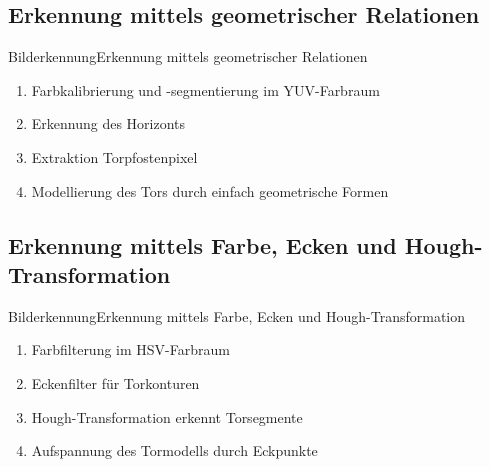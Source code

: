 \documentclass{beamer}
\begin{document}
\subsection{Erkennung mittels geometrischer Relationen}
\begin{frame}{Bilderkennung}{Erkennung mittels geometrischer Relationen}
\begin{enumerate}
    \item Farbkalibrierung und -segmentierung im YUV-Farbraum
    \item Erkennung des Horizonts
    \item Extraktion Torpfostenpixel
    \item Modellierung des Tors durch einfach geometrische Formen
\end{enumerate}
\end{frame}

\subsection{Erkennung mittels Farbe, Ecken und Hough-Transformation}
\begin{frame}{Bilderkennung}{Erkennung mittels Farbe, Ecken und Hough-Transformation}
\begin{enumerate}
    \item Farbfilterung im HSV-Farbraum
    \item Eckenfilter für Torkonturen
    \item Hough-Transformation erkennt Torsegmente
    \item Aufspannung des Tormodells durch Eckpunkte
\end{enumerate}
\end{frame}
\end{document}
